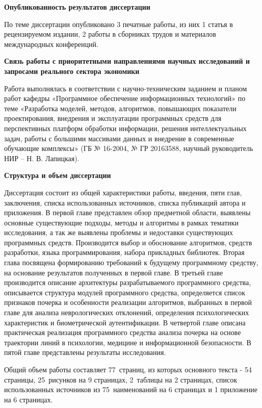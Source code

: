 \bigskip
\textbf{Опубликованность результатов диссертации}
\bigskip

По теме диссертации опубликовано 3 печатные работы, из них 1 статья в рецензируемом издании, 2 работы в сборниках трудов и материалов международных конференций.

\bigskip
\textbf{Связь работы с приоритетными направлениями научных исследований и запросами реального сектора экономики}
\bigskip

Работа выполнялась в соответствии с научно-техническим заданием и планом работ кафедры «Программное обеспечение информационных технологий» по теме  «Разработка моделей, методов, алгоритмов, повышающих показатели проектирования, внедрения и  эксплуатации программных средств для перспективных платформ обработки информации, решения интеллектуальных задач,  работы с большими массивами данных и внедрение в современные обучающие комплексы» (ГБ № 16-2004, № ГР 20163588, научный руководитель НИР – Н. В. Лапицкая).

\bigskip
\textbf{Структура и объем диссертации}
\bigskip

Диссертация состоит из общей характеристики работы, введения, пяти глав, заключения, списка использованных источников, списка публикаций автора и приложения. В первой главе представлен обзор предметной области, выявлены основные существующие подходы, методы и алгоритмы в рамках тематики исследования, а так же выявлены проблемы и недоставки существующих программных средств. Производится выбор и обоснование алгоритмов, средств разработки, языка программирования, набора прикладных библиотек. Вторая глава посвящена формированию требований к будущему программному средству, на основание результатов полученных в первой главе. В третьей главе производится описание архитектуры разрабатываемого программного средства, описывается структура модулей программного средства, определяется список признаков почерка и особенности реализации алгоритмов, выбранных в первой главе для анализа неврологических отклонений, определения психологических характеристик и биометрической аутентификации. В четвертой главе описана практическая реализация программного средства анализа почерка на основе траектории линий в психологии, медицине и информационной безопасности. В пятой главе представлены результаты исследования.

Общий объем работы составляет 77~страниц, из которых основного текста - 54 страницы, 25~рисунков на 9 страницах, 2~таблицы на 2 страницах, список использованных источников из 75~наименований на 6 страницах и 1 приложение на 6 страницах.

